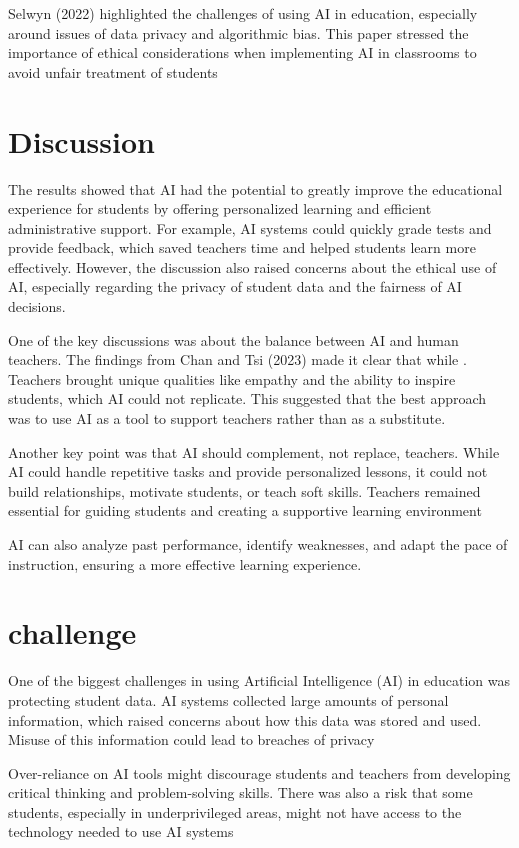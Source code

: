 \documentclass[conference]{IEEEtran}
\begin{document}
Selwyn (2022) highlighted the challenges of using AI in education, especially around issues of data privacy and algorithmic bias. This paper stressed the importance of ethical considerations when implementing AI in classrooms to avoid unfair treatment of students \cite{r4}


\section{Discussion}
The results showed that AI had the potential to greatly improve the educational experience for students by offering personalized learning and efficient administrative support. For example, AI systems could quickly grade tests and provide feedback, which saved teachers time and helped students learn more effectively. However, the discussion also raised concerns about the ethical use of AI, especially regarding the privacy of student data and the fairness of AI decisions.

One of the key discussions was about the balance between AI and human teachers. The findings from Chan and Tsi (2023) made it clear that while . Teachers brought unique qualities like empathy and the ability to inspire students, which AI could not replicate. This suggested that the best approach was to use AI as a tool to support teachers rather than as a substitute.

Another key point was that AI should complement, not replace, teachers. While AI could handle repetitive tasks and provide personalized lessons, it could not build relationships, motivate students, or teach soft skills. Teachers remained essential for guiding students and creating a supportive learning environment


AI can also analyze past performance, identify weaknesses, and adapt the pace of instruction, ensuring a more effective learning experience.

\section{challenge }

One of the biggest challenges in using Artificial Intelligence (AI) in education was protecting student data. AI systems collected large amounts of personal information, which raised concerns about how this data was stored and used. Misuse of this information could lead to breaches of privacy \cite{r3} \cite{r8}

Over-reliance on AI tools might discourage students and teachers from developing critical thinking and problem-solving skills. There was also a risk that some students, especially in underprivileged areas, might not have access to the technology needed to use AI systems \cite{r10}
\end{document}
